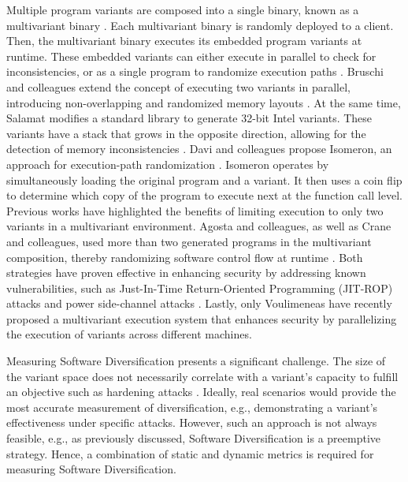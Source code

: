 \begin{strategy}
    Multiple program variants are composed into a single binary, known as a multivariant binary \cite{cox06}. 
    Each multivariant binary is randomly deployed to a client.
    Then, the multivariant binary executes its embedded program variants at runtime. 
    These embedded variants can either execute in parallel to check for inconsistencies, or as a single program to randomize execution paths \cite{bhatkar03}. 
    Bruschi and colleagues extend the concept of executing two variants in parallel, introducing non-overlapping and randomized memory layouts \cite{bruschi2007diversified}. 
    At the same time, Salamat \etal modifies a standard library to generate 32-bit Intel variants. 
    These variants have a stack that grows in the opposite direction, allowing for the detection of memory inconsistencies \cite{salamat2007stopping}. 
    Davi and colleagues propose Isomeron, an approach for execution-path randomization \cite{davi2015isomeron}. 
    Isomeron operates by simultaneously loading the original program and a variant. 
    It then uses a coin flip to determine which copy of the program to execute next at the function call level. 
    Previous works have highlighted the benefits of limiting execution to only two variants in a multivariant environment. 
    Agosta and colleagues, as well as Crane and colleagues, used more than two generated programs in the multivariant composition, thereby randomizing software control flow at runtime \cite{agosta2015meet, crane2015thwarting}. 
    Both strategies have proven effective in enhancing security by addressing known vulnerabilities, such as Just-In-Time Return-Oriented Programming (JIT-ROP) attacks \cite{jackson2011compiler} and power side-channel attacks \cite{amarilli2011can}. 
    Lastly, only Voulimeneas \etal \cite{voulimeneas2021dmvx} have recently proposed a multivariant execution system that enhances security by parallelizing the execution of variants across different machines.
\end{strategy}


Measuring Software Diversification presents a significant challenge. 
The size of the variant space does not necessarily correlate with a variant's capacity to fulfill an objective such as hardening attacks \cite{cohen1993operating}. 
Ideally, real scenarios would provide the most accurate measurement of diversification, e.g., demonstrating a variant's effectiveness under specific attacks. 
However, such an approach is not always feasible, e.g., as previously discussed, Software Diversification is a preemptive strategy. 
Hence, a combination of static and dynamic metrics is required for measuring Software Diversification.

